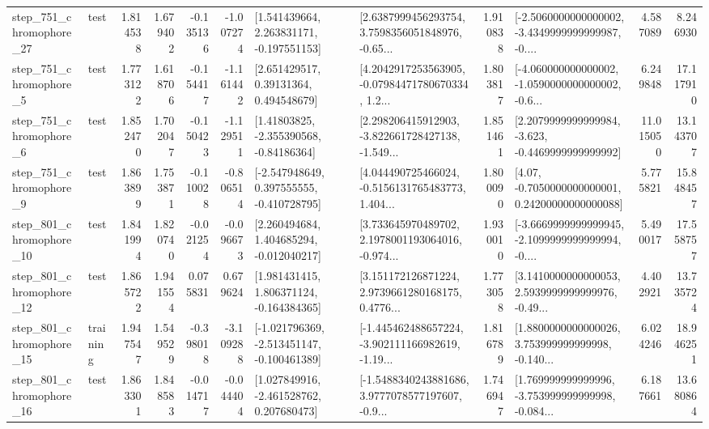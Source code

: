 \begin{tabular}{llrrrrllrlrr}
  step\_751\_chromophore\_27 &      test &      1.814538 &    1.679402 &     -0.135136 & -1.007274 &    [1.541439664, 2.263831171, -0.197551153] &  [2.6387999456293754, 3.7598356051848976, -0.65... &       1.910838 &  [-2.5060000000000002, -3.4349999999999987, -0.... &            4.587089 &          8.246930 \\
   step\_751\_chromophore\_5 &      test &      1.773122 &    1.618706 &     -0.154417 & -1.161442 &      [2.651429517, 0.39131364, 0.494548679] &  [4.2042917253563905, -0.07984471780670334, 1.2... &       1.803817 &  [-4.060000000000002, -1.0590000000000002, -0.6... &            6.249848 &         17.117910 \\
   step\_751\_chromophore\_6 &      test &      1.852470 &    1.702047 &     -0.150423 & -1.129511 &     [1.41803825, -2.355390568, -0.84186364] &  [2.298206415912903, -3.822661728427138, -1.549... &       1.851461 &  [2.2079999999999984, -3.623, -0.4469999999999992] &           11.015050 &         13.143707 \\
   step\_751\_chromophore\_9 &      test &      1.863899 &    1.753871 &     -0.110028 & -0.806514 &   [-2.547948649, 0.397555555, -0.410728795] &  [4.044490725466024, -0.5156131765483773, 1.404... &       1.800090 &   [4.07, -0.7050000000000001, 0.24200000000000088] &            5.775821 &         15.848457 \\
  step\_801\_chromophore\_10 &      test &      1.841994 &    1.820740 &     -0.021254 & -0.096673 &    [2.260494684, 1.404685294, -0.012040217] &  [3.733645970489702, 2.1978001193064016, -0.974... &       1.930010 &  [-3.6669999999999945, -2.1099999999999994, -0.... &            5.490017 &         17.558757 \\
  step\_801\_chromophore\_12 &      test &      1.865722 &    1.941554 &      0.075831 &  0.679624 &    [1.981431415, 1.806371124, -0.164384365] &  [3.151172126871224, 2.9739661280168175, 0.4776... &       1.773058 &  [3.1410000000000053, 2.5939999999999976, -0.49... &            4.402921 &         13.735724 \\
  step\_801\_chromophore\_15 &  training &      1.947547 &    1.549529 &     -0.398018 & -3.109288 &  [-1.021796369, -2.513451147, -0.100461389] &  [-1.445462488657224, -3.902111166982619, -1.19... &       1.816789 &  [1.8800000000000026, 3.753999999999998, -0.140... &            6.024246 &         18.946251 \\
  step\_801\_chromophore\_16 &      test &      1.863301 &    1.848583 &     -0.014717 & -0.044404 &    [1.027849916, -2.461528762, 0.207680473] &  [-1.5488340243881686, 3.9777078577197607, -0.9... &       1.746947 &  [1.769999999999996, -3.753999999999998, -0.084... &            6.187661 &         13.680864 \\

\end{tabular}
